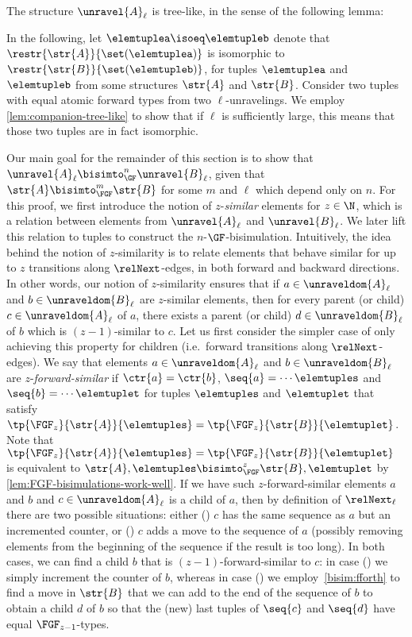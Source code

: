 \noindent
The structure $\unravel{A}_{\ell}$ is tree-like, in the sense of the following lemma:


\noindent
In the following, let $\elemtuplea \isoeq \elemtupleb$ denote that $\restr{\str{A}}{\set(\elemtuplea)}$ is isomorphic to $\restr{\str{B}}{\set(\elemtupleb)}$, for tuples $\elemtuplea$ and $\elemtupleb$ from some structures $\str{A}$ and $\str{B}$.
Consider two tuples with equal atomic forward types from two $\ell$-unravelings.
We employ \cref{lem:companion-tree-like} to show that if $\ell$ is sufficiently large, this means that those two tuples are in fact isomorphic.


Our main goal for the remainder of this section is to show that $\unravel{A}_{\ell} \bisimto_{\GF}^{n} \unravel{B}_{\ell}$, given that $\str{A} \bisimto_{\FGF}^{m} \str{B}$ for some $m$ and $\ell$ which depend only on $n$.
For this proof, we first introduce the notion of $z$-\emph{similar} elements for $z \in \N$, which is a relation between elements from $\unravel{A}_{\ell}$ and $\unravel{B}_{\ell}$.
We later lift this relation to tuples to construct the $n$-$\GF$-bisimulation.
Intuitively, the idea behind the notion of $z$-similarity is to relate elements that behave similar for up to $z$ transitions along $\relNext$-edges, in both forward and backward directions.
In other words, our notion of $z$-similarity ensures that if $a \in \unraveldom{A}_{\ell}$ and $b \in \unraveldom{B}_{\ell}$ are $z$-similar elements, then for every parent (or child) $c \in \unraveldom{A}_{\ell}$ of $a$, there exists a parent (or child) $d \in \unraveldom{B}_{\ell}$ of $b$ which is $(z{-}1)$-similar to $c$.
Let us first consider the simpler case of only achieving this property for children (i.e.\ forward transitions along $\relNext$-edges).
We say that elements $a \in \unraveldom{A}_{\ell}$ and $b \in \unraveldom{B}_{\ell}$ are $z$-\emph{forward-similar} if $\ctr{a} = \ctr{b}$, $\seq{a} = \cdots \elemtuples$ and $\seq{b} = \cdots \elemtuplet$ for tuples $\elemtuples$ and $\elemtuplet$ that satisfy $\tp{\FGF_{z}}{\str{A}}{\elemtuples} = \tp{\FGF_{z}}{\str{B}}{\elemtuplet}$.
Note that $\tp{\FGF_{z}}{\str{A}}{\elemtuples} = \tp{\FGF_{z}}{\str{B}}{\elemtuplet}$ is equivalent to $\str{A}, \elemtuples \bisimto_{\FGF}^{z} \str{B}, \elemtuplet$ by \cref{lem:FGF-bisimulations-work-well}.
If we have such $z$-forward-similar elements $a$ and $b$ and $c \in \unraveldom{A}_{\ell}$ is a child of $a$, then by definition of $\relNext_{\ell}$ there are two possible situations: either () $c$ has the same sequence as $a$ but an incremented counter, or () $c$ adds a move to the sequence of $a$ (possibly removing elements from the beginning of the sequence if the result is too long).
In both cases, we can find a child $b$ that is $(z{-}1)$-forward-similar to $c$: in case () we simply increment the counter of $b$, whereas in case () we employ~\ref{bisim:fforth} to find a move in $\str{B}$ that we can add to the end of the sequence of $b$ to obtain a child $d$ of $b$ so that the (new) last tuples of $\seq{c}$ and $\seq{d}$ have equal $\FGF_{z{-}1}$-types.

